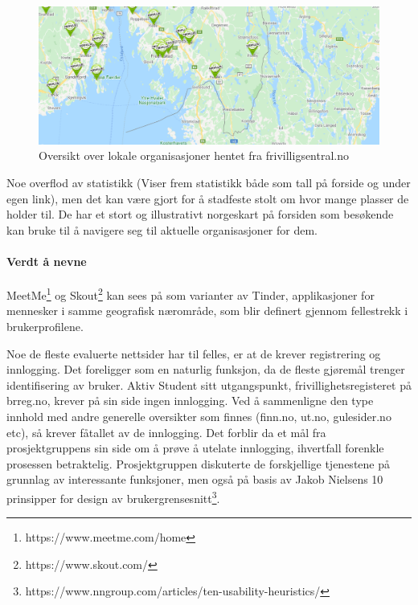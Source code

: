 \begin{figure}[H]
\centering
\includegraphics[width=1\textwidth]{Illustrasjoner/frivillig_kart.png}
\caption{Oversikt over lokale organisasjoner hentet fra frivilligsentral.no}
\end{figure}

Noe overflod av statistikk (Viser frem statistikk både som tall på forside og under egen link), men det kan være gjort for å stadfeste stolt om hvor mange plasser de holder til. De har et stort og illustrativt norgeskart på forsiden som besøkende kan bruke til å navigere seg til aktuelle organisasjoner for dem.



\paragraph{Verdt å nevne} MeetMe\footnote{https://www.meetme.com/home} og Skout\footnote{https://www.skout.com/} kan sees på som varianter av Tinder, applikasjoner for mennesker i samme geografisk nærområde, som blir definert gjennom fellestrekk i brukerprofilene.

\vspace{5mm} %

Noe de fleste evaluerte nettsider har til felles, er at de krever registrering og innlogging. Det foreligger som en naturlig funksjon, da de fleste gjøremål trenger identifisering av bruker. Aktiv Student sitt utgangspunkt, frivillighetsregisteret på brreg.no, krever på sin side ingen innlogging. Ved å sammenligne den type innhold med andre generelle oversikter som finnes (finn.no, ut.no, gulesider.no etc), så krever fåtallet av de innlogging. Det forblir da et mål fra prosjektgruppens sin side om å prøve å utelate innlogging, ihvertfall forenkle prosessen betraktelig. Prosjektgruppen diskuterte de forskjellige tjenestene på grunnlag av interessante funksjoner, men også på basis av Jakob Nielsens 10 prinsipper for design av brukergrensesnitt\footnote{https://www.nngroup.com/articles/ten-usability-heuristics/}.

